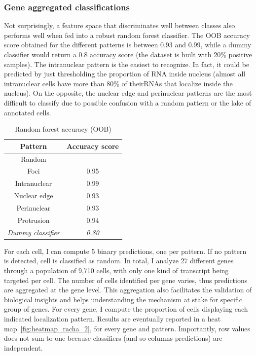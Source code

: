 \subsubsection{Gene aggregated classifications}


Not surprisingly, a feature space that discriminates well between classes also performs well when fed into a robust random forest classifier.
The \ac{OOB} accuracy score obtained for the different patterns is between 0.93 and 0.99, while a dummy classifier would return a 0.8 accuracy score (the dataset is built with 20\% positive samples).
The intranuclear pattern is the easiest to recognize.
In fact, it could be predicted by just thresholding the proportion of \ac{RNA} inside nucleus (almost all intranuclear cells have more than 80\% of their\ac{RNA}s that localize inside the nucleus).
On the opposite, the nuclear edge and perinuclear patterns are the most difficult to classify due to possible confusion with a random pattern or the lake of annotated cells.

\begin{table}
	\centering
	\begin{tabular}{| c | c |}
		\hline
		Pattern & Accuracy score\\
		\hline
		Random & -\\
		Foci & 0.95\\
		Intranuclear & 0.99\\
		Nuclear edge & 0.93\\
		Perinuclear & 0.93\\
		Protrusion & 0.94\\
		\hline
		\textit{Dummy classifier} & \textit{0.80}\\
		\hline
	\end{tabular}
	\caption{Random forest accuracy (OOB)}
	\label{table:accuracy_oob}
\end{table}

For each cell, I can compute 5 binary predictions, one per pattern.
If no pattern is detected, cell is classified as random.
In total, I analyze 27 different genes through a population of 9,710 cells, with only one kind of transcript being targeted per cell.
The number of cells identified per gene varies, thus predictions are aggregated at the gene level.
This aggregation also facilitates the validation of biological insights and helps understanding the mechanism at stake for specific group of genes.
For every gene, I compute the proportion of cells displaying each indicated localization pattern.
Results are eventually reported in a heat map~\ref{fig:heatmap_racha_2}, for every gene and pattern.
Importantly, row values does not sum to one because classifiers (and so columns predictions) are  independent.

